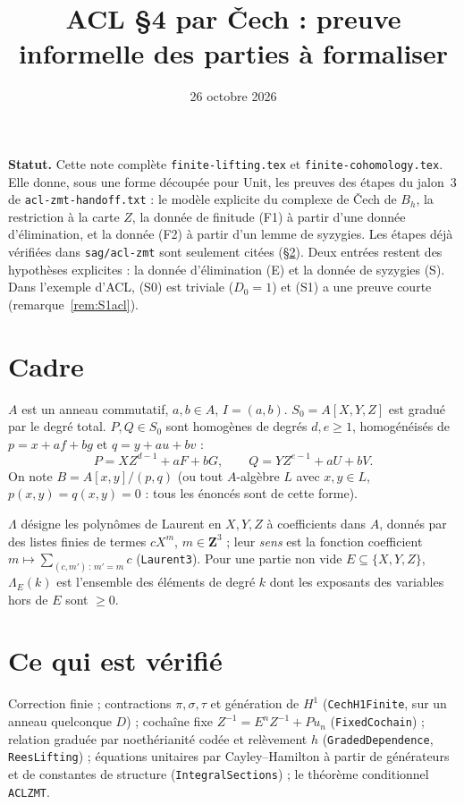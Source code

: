 \documentclass[11pt]{amsart}
\title{ACL \S4 par \v{C}ech : preuve informelle des parties \`a formaliser}
\date{26 octobre 2026}
\theoremstyle{remark}
\newcommand{\La}{\Lambda}
\begin{document}
\maketitle

\noindent\textbf{Statut.}
Cette note complète \texttt{finite-lifting.tex} et
\texttt{finite-cohomology.tex}. Elle donne, sous une forme découpée pour
Unit, les preuves des étapes du jalon~3 de \texttt{acl-zmt-handoff.txt} :
le modèle explicite du complexe de Čech de $B_h$, la restriction à la
carte $Z$, la donnée de finitude (F1) à partir d'une donnée d'élimination,
et la donnée (F2) à partir d'un lemme de syzygies. Les étapes déjà
vérifiées dans \texttt{sag/acl-zmt} sont seulement citées
(\S\ref{sec:verifie}). Deux entrées restent des hypothèses explicites :
la donnée d'élimination (E) et la donnée de syzygies (S). Dans l'exemple
d'ACL, (S0) est triviale ($D_0=1$) et (S1) a une preuve courte
(remarque~\ref{rem:S1acl}).

\section{Cadre}

$A$ est un anneau commutatif, $a,b\in A$, $I=(a,b)$. $S_0=A[X,Y,Z]$ est
gradué par le degré total. $P,Q\in S_0$ sont homogènes de degrés $d,e\ge1$,
homogénéisés de $p=x+af+bg$ et $q=y+au+bv$ :
\[
 P=XZ^{d-1}+aF+bG,\qquad Q=YZ^{e-1}+aU+bV .
\]
On note $B=A[x,y]/(p,q)$ (ou tout $A$-algèbre $L$ avec $x,y\in L$,
$p(x,y)=q(x,y)=0$ : tous les énoncés sont de cette forme).

$\La$ désigne les polynômes de Laurent en $X,Y,Z$ à coefficients dans $A$,
donnés par des listes finies de termes $cX^m$, $m\in\mathbf Z^3$ ; leur
\emph{sens} est la fonction coefficient $m\mapsto\sum_{(c,m')\,:\,m'=m}c$
(\texttt{Laurent3}). Pour une partie non vide $E\subseteq\{X,Y,Z\}$,
$\La_E(k)$ est l'ensemble des éléments de degré $k$ dont les exposants
des variables hors de $E$ sont $\ge0$.

\section{Ce qui est vérifié}\label{sec:verifie}
Correction finie ; contractions $\pi,\sigma,\tau$ et génération de
$H^1$ (\texttt{CechH1Finite}, sur un anneau quelconque $D$) ; cochaîne
fixe $Z^{-1}=E^nZ^{-1}+Pu_n$ (\texttt{FixedCochain}) ; relation graduée
par noethérianité codée et relèvement $h$ (\texttt{GradedDependence},
\texttt{ReesLifting}) ; équations unitaires par Cayley--Hamilton à partir
de générateurs et de constantes de structure (\texttt{IntegralSections}) ;
le théorème conditionnel \texttt{ACLZMT}.
\end{document}

